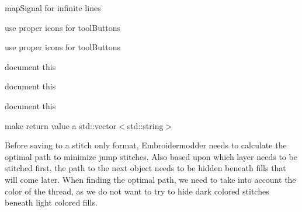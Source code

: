 \begin{DoxyRefList}
map\+Signal for infinite lines  
\item[Member \mbox{\hyperlink{class_property_editor_abb548c17f8edeaabbd56962a8bb2be1d}{Property\+Editor\+::create\+Group\+Box\+Misc\+Arc}} ()]\label{todo__todo000022}%
%
use proper icons for tool\+Buttons  
\item[Member \mbox{\hyperlink{class_property_editor_a3404c3a703f98e605cadb445cc3c524b}{Property\+Editor\+::create\+Group\+Box\+Misc\+Image}} ()]\label{todo__todo000027}%
%
use proper icons for tool\+Buttons  
\item[Member \mbox{\hyperlink{class_property_editor_a25880d96f0b4466fc4342255adaa7022}{Property\+Editor\+::create\+Tool\+Button\+QSelect}} ()]\label{todo__todo000019}%
%
document this  
\item[Member \mbox{\hyperlink{class_property_editor_ad7452c5931d2f0c7f63a308d1ccccfc7}{Property\+Editor\+::event\+Filter}} (QObject $\ast$obj, QEvent $\ast$event)]\label{todo__todo000017}%
%
document this  
\item[Member \mbox{\hyperlink{class_property_editor_a4bca2abc45a97402b7135f7b8407d125}{Property\+Editor\+::$\sim$\+Property\+Editor}} ()]\label{todo__todo000016}%
%
document this  
\item[Member \mbox{\hyperlink{class_rect_object_acfde9da59c0bbaaab7decdc222aa38a3}{Rect\+Object\+::all\+Grip\+Points}} ()]\label{todo__todo000012}%
%
make return value a std\+::vector$<$std\+::string$>$  
\item[Member \mbox{\hyperlink{class_save_object_a15bdf578a20c1c1cb630dc8264448484}{Save\+Object\+::save}} (const QString \&file\+Name)]\label{todo__todo000013}%
%
Before saving to a stitch only format, Embroidermodder needs to calculate the optimal path to minimize jump stitches. Also based upon which layer needs to be stitched first, the path to the next object needs to be hidden beneath fills that will come later. When finding the optimal path, we need to take into account the color of the thread, as we do not want to try to hide dark colored stitches beneath light colored fills.  
\item[Member \mbox{\hyperlink{class_save_object_aaa28ee2579ab1b54602812d652889737}{Save\+Object\+::to\+Polyline}} (Emb\+Pattern $\ast$pattern, const QPointF \&obj\+Pos, const QPainter\+Path \&obj\+Path, const QString \&layer, const QColor \&color, const QString \&line\+Type, const QString \&line\+Weight)]\label{todo__todo000014}%

\end{DoxyRefList}
